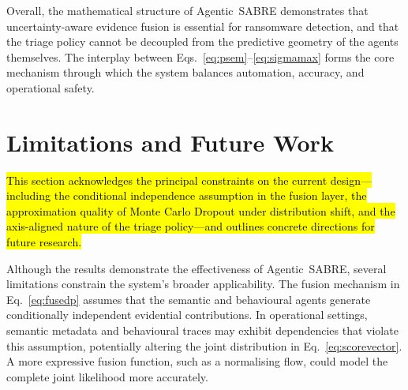 \documentclass[3p]{elsarticle}
\begin{document}
\begin{table}[ht]
\centering
\caption{Measured inference latency and throughput per SABRE component (NVIDIA GB10 GPU, $T=10$ MC Dropout passes, $n=500$ repetitions). Full pipeline (B+S) is estimated as the serial sum of per-agent latencies plus fusion overhead.}
\label{tab:runtime_comparison}
\end{table}

Overall, the mathematical structure of Agentic~SABRE demonstrates that uncertainty-aware evidence fusion is essential for ransomware detection, and that the triage policy cannot be decoupled from the predictive geometry of the agents themselves. The interplay between Eqs.~\eqref{eq:psem}--\eqref{eq:sigmamax} forms the core mechanism through which the system balances automation, accuracy, and operational safety.

\section{Limitations and Future Work}
\label{sec:limitations}

\hl{This section acknowledges the principal constraints on the current design---including the
conditional independence assumption in the fusion layer, the approximation quality of Monte
Carlo Dropout under distribution shift, and the axis-aligned nature of the triage
policy---and outlines concrete directions for future research.}

Although the results demonstrate the effectiveness of Agentic~SABRE, several limitations constrain the system’s broader applicability. The fusion mechanism in Eq.~\eqref{eq:fusedp} assumes that the semantic and behavioural agents generate conditionally independent evidential contributions. In operational settings, semantic metadata and behavioural traces may exhibit dependencies that violate this assumption, potentially altering the joint distribution in Eq.~\eqref{eq:scorevector}. A more expressive fusion function, such as a normalising flow, could model the complete joint likelihood more accurately.
\end{document}
